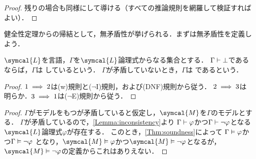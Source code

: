 \begin{proof}
	残りの場合も同様にして導ける（すべての推論規則を網羅して検証すればよい）．
\end{proof}

健全性定理からの帰結として，無矛盾性が挙げられる．まずは無矛盾性を定義しよう．

\begin{Def} \label{Def:consistency}
	\(\symcal{L}\)を言語，\(\Gamma\)を\(\symcal{L}\)論理式からなる集合とする．
	\(\Gamma \vdash \bot\)であるならば，\(\Gamma\)は%
	しているという．
	\(\Gamma\)が矛盾していないとき，\(\Gamma\)は
	であるという．
\end{Def}


\begin{proof}
	\(1 \implies 2\)は(w)規則と(\(\lnot\)I)規則，および(DNF)規則から従う．
	\(2 \implies 3\)は明らか．\(3 \implies 1\)は(\(\lnot\)E)規則から従う．
\end{proof}


\begin{proof}
	\(\Gamma\)がモデルをもつが矛盾していると仮定し，\(\symcal{M}\)を\(\Gamma\)のモデルとする．
	\(\Gamma\)が矛盾しているので，\cref{Lemma:inconsistency}より
	\(\Gamma \vdash \varphi\)かつ\(\Gamma \vdash \lnot \varphi\)となる\(\symcal{L}\)論理式\(\varphi\)が存在する．
	このとき，\cref{Thm:soundness}によって
	\(\Gamma \vDash \varphi\)かつ\(\Gamma \vDash \lnot \varphi\)
	となり，\(\symcal{M} \satisfy \varphi\)かつ\(\symcal{M} \satisfy \lnot \varphi\)となるが，
	\(\symcal{M} \satisfy \lnot \varphi\)の定義からこれはありえない．
\end{proof}

